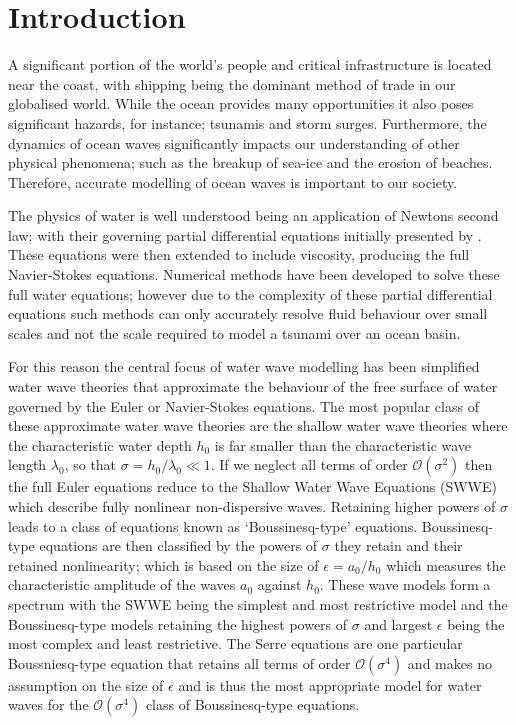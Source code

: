 
\chapter{Introduction}
\label{chp:Introduction}

A significant portion of the world's people and critical infrastructure is located near the coast, with shipping being the dominant method of trade in our globalised world. While the ocean provides many opportunities it also poses significant hazards, for instance; tsunamis and storm surges. Furthermore, the dynamics of ocean waves significantly impacts our understanding of other physical phenomena; such as the breakup of sea-ice and the erosion of beaches. Therefore, accurate modelling of ocean waves is important to our society. 

The physics of water is well understood being an application of Newtons second law; with their governing partial differential equations initially presented by \citet{Euler-1755-274}. These equations were then extended to include viscosity, producing the full Navier-Stokes equations. Numerical methods \cite{Chorin-1967-928,Taylor-Hood-1973-73,Bassi-1997-267} have been developed to solve these full water equations; however due to the complexity of these partial differential equations such methods can only accurately resolve fluid behaviour over small scales and not the scale required to model a tsunami over an ocean basin. 

For this reason the central focus of water wave modelling has been simplified water wave theories that approximate the behaviour of the free surface of water governed by the Euler or Navier-Stokes equations. The most popular class of these approximate water wave theories are the shallow water wave theories where the characteristic water depth $h_0$ is far smaller than the characteristic wave length $\lambda_0$, so that $\sigma = h_0 / \lambda_0 \ll 1$. If we neglect all terms of order $\mathcal{O}\left(\sigma ^2\right)$ then the full Euler equations reduce to the Shallow Water Wave Equations (SWWE) \cite{Bonneton-Lannes-2009-16601} which describe fully nonlinear non-dispersive waves. Retaining higher powers of $\sigma$ leads to a class of equations known as `Boussinesq-type' equations. Boussinesq-type equations are then classified by the powers of $\sigma$ they retain and their retained nonlinearity; which is based on the size of $\epsilon= a_0 / h_0$ which measures the characteristic amplitude of the waves $a_0$ against $h_0$. These wave models form a spectrum with the SWWE being the simplest and most restrictive model and the Boussinesq-type models retaining the highest powers of $\sigma$ and largest $\epsilon$ being the most complex and least restrictive. The Serre equations are one particular Boussniesq-type equation that retains all terms of order $\mathcal{O}\left(\sigma ^4\right)$ and makes no assumption on the size of $\epsilon$ \cite{Bonneton-Lannes-2009-16601} and is thus the most appropriate model for water waves for the $\mathcal{O}\left(\sigma ^4\right)$ class of Boussinesq-type equations. 


